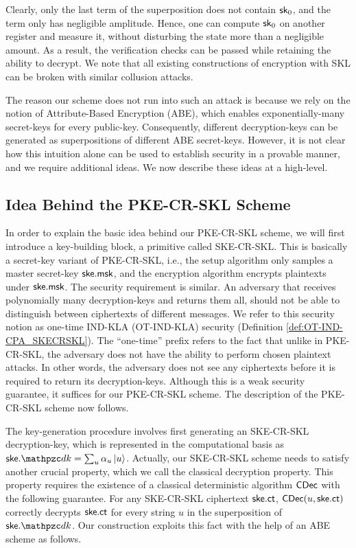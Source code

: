 Clearly, only the last term of the superposition does not contain
$\mathsf{sk}_0$, and the term only has negligible amplitude.
Hence, one can compute $\mathsf{sk}_0$ on another register and measure
it, without disturbing the state more than a negligible amount. As a result, the verification checks can be passed while retaining the ability to decrypt. We note that all existing constructions of encryption with SKL can be broken with similar collusion attacks. 

The reason our scheme does not run into such an attack is because we
rely on the notion of Attribute-Based Encryption (ABE), which
enables exponentially-many secret-keys for every public-key.
Consequently, different decryption-keys can be generated as
superpositions of different ABE secret-keys. However, it is not
clear how this intuition alone can be used to establish security in
a provable manner, and we require additional ideas. We now describe
these ideas at a high-level.

\subsection{Idea Behind the PKE-CR-SKL Scheme}

In order to explain the basic idea behind our PKE-CR-SKL scheme, we
will first introduce a key-building block, a primitive called
SKE-CR-SKL. This is basically a secret-key variant of PKE-CR-SKL,
i.e., the setup algorithm only samples a master secret-key $\mathsf{ske}.\mathsf{msk}$, and
the encryption algorithm encrypts plaintexts under $\mathsf{ske}.\mathsf{msk}$. The
security requirement is similar. An adversary that receives polynomially
many decryption-keys and returns them all, should not be able to
distinguish between ciphertexts of different messages. We refer to
this security notion as one-time IND-KLA (OT-IND-KLA) security
(Definition \ref{def:OT-IND-CPA_SKECRSKL}).
The ``one-time'' prefix refers to the fact that unlike in PKE-CR-SKL,
the adversary does not have the ability to perform chosen plaintext
attacks. In other words, the adversary does not see any ciphertexts
before it is required to return its decryption-keys. Although this is
a weak security guarantee, it suffices for our PKE-CR-SKL scheme. The
description of the PKE-CR-SKL scheme now follows.

The key-generation procedure involves first generating an SKE-CR-SKL
decryption-key, which is represented in the computational basis as
$\ske.\qdk = \sum_u \alpha_u \ket{u}$.
Actually, our SKE-CR-SKL scheme needs to
satisfy another crucial property, which we call the classical
decryption property. This property requires the existence of a
classical deterministic algorithm $\mathsf{CDec}$ with the following
guarantee.  For any SKE-CR-SKL ciphertext $\mathsf{ske}.\mathsf{ct}$, $\mathsf{CDec}(u, \mathsf{ske}.\mathsf{ct})$
correctly decrypts $\mathsf{ske}.\mathsf{ct}$ for every string $u$ in the superposition of
$\ske.\qdk$. Our construction exploits this fact with the help of an
ABE scheme as follows.

